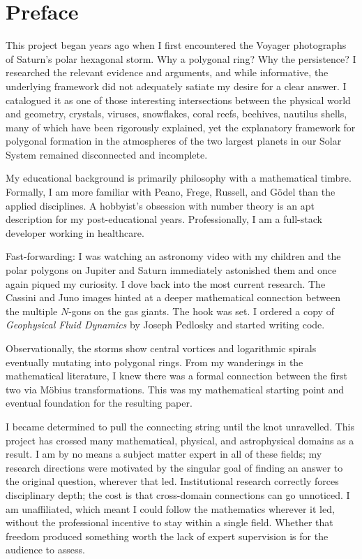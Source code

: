 \section*{Preface}

This project began years ago when I first encountered the Voyager
photographs of Saturn's polar hexagonal storm.  Why a polygonal ring?
Why the persistence?  I researched the relevant evidence and arguments,
and while informative, the underlying framework did not adequately
satiate my desire for a clear answer.  I catalogued it as one of
those interesting intersections between the physical world and
geometry, crystals, viruses, snowflakes, coral reefs, beehives,
nautilus shells, many of which have been rigorously explained, yet
the explanatory framework for polygonal formation in the atmospheres
of the two largest planets in our Solar System remained disconnected
and incomplete.

My educational background is primarily philosophy with a mathematical
timbre.  Formally, I am more familiar with Peano, Frege, Russell, and
G\"odel than the applied disciplines.  A hobbyist's obsession with
number theory is an apt description for my post-educational years.
Professionally, I am a full-stack developer working in healthcare.

Fast-forwarding: I was watching an astronomy video with my children and
the polar polygons on Jupiter and Saturn immediately astonished them
and once again piqued my curiosity.  I dove back into the most current
research.  The Cassini and Juno images hinted at a deeper mathematical
connection between the multiple $N$-gons on the gas giants.  The hook
was set.  I ordered a copy of \emph{Geophysical Fluid Dynamics} by
Joseph Pedlosky and started writing code.

Observationally, the storms show central vortices and logarithmic
spirals eventually mutating into polygonal rings.  From my wanderings
in the mathematical literature, I knew there was a formal connection
between the first two via M\"obius transformations.  This was my
mathematical starting point and eventual foundation for the resulting
paper.

I became determined to pull the connecting string until the knot
unravelled.  This project has crossed many mathematical, physical,
and astrophysical domains as a result.  I am by no means a subject
matter expert in all of these fields; my research directions were
motivated by the singular goal of finding an answer to the original
question, wherever that led.  Institutional research correctly forces
disciplinary depth; the cost is that cross-domain connections can go
unnoticed.  I am unaffiliated, which meant I could follow the
mathematics wherever it led, without the professional incentive to
stay within a single field.  Whether that freedom produced something
worth the lack of expert supervision is for the audience to assess.

